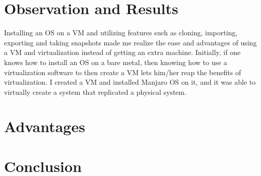 \documentclass[a4paper,12pt]{report}
\begin{document}
\section{Observation and Results}
Installing an OS on a VM and utilizing features such as cloning, importing, exporting and taking snapshots made me realize the ease and advantages of using a VM and virtualization instead of getting an extra machine.
\newline
Initially, if one knows how to install an OS on a bare metal, then knowing how to use a virtualization software to then create a VM lets him/her reap the benefits of virtualization.
I created a VM and installed Manjaro OS on it, and it was able to virtually create a system that replicated a physical system. 

\section{Advantages}
\section{Conclusion}
\end{document}
